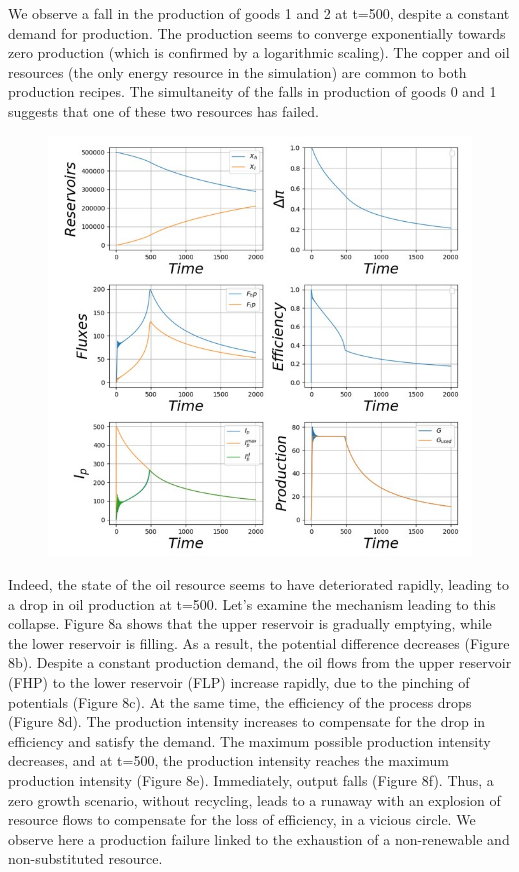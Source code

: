 \documentclass[12pt,a4paper]{article}%
\begin{document}
\begin{appendix}
We observe a fall in the production of goods 1 and 2 at t=500, despite a constant demand for production. The production seems to converge exponentially towards zero production (which is confirmed by a logarithmic scaling).  The copper and oil resources (the only energy resource in the simulation) are common to both production recipes. The simultaneity of the falls in production of goods 0 and 1 suggests that one of these two resources has failed.  
\begin{figure}[h]
	\centering 
	\includegraphics[width=1.0\textwidth]{figures/Tableau-Bord8.jpg}
\end{figure} 
Indeed, the state of the oil resource seems to have deteriorated rapidly, leading to a drop in oil production at t=500. Let's examine the mechanism leading to this collapse.  Figure 8a shows that the upper reservoir is gradually emptying, while the lower reservoir is filling. As a result, the potential difference decreases (Figure 8b). Despite a constant production demand, the oil flows from the upper reservoir (FHP) to the lower reservoir (FLP) increase rapidly, due to the pinching of potentials (Figure 8c). At the same time, the efficiency of the process drops (Figure 8d). The production intensity increases to compensate for the drop in efficiency and satisfy the demand. The maximum possible production intensity decreases, and at t=500, the production intensity reaches the maximum production intensity (Figure 8e). Immediately, output falls (Figure 8f).  Thus, a zero growth scenario, without recycling, leads to a runaway with an explosion of resource flows to compensate for the loss of efficiency, in a vicious circle. We observe here a production failure linked to the exhaustion of a non-renewable and non-substituted resource.  

\end{appendix}
\end{document}
